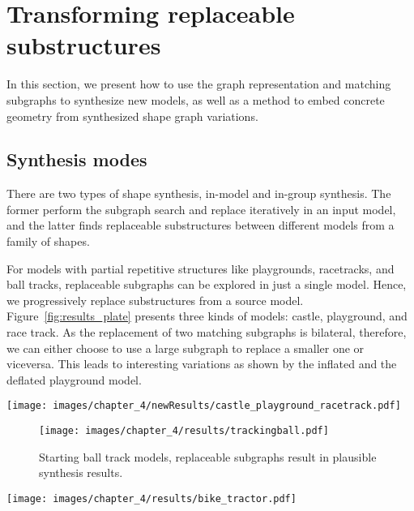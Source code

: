 \section{Transforming replaceable substructures}

In this section, we present how to use the graph representation and matching subgraphs to synthesize new models, as well as a method to embed concrete geometry from synthesized shape graph variations.

\subsection{Synthesis modes}

There are two types of shape synthesis, in-model and in-group synthesis. The former perform the subgraph search and replace iteratively in an input model, and the latter finds replaceable substructures between different models from a family of shapes.

For models with partial repetitive structures like playgrounds, racetracks, and ball tracks, replaceable subgraphs can be explored in just a single model. Hence, we progressively replace substructures from a source model. Figure~\ref{fig:results_plate} presents three kinds of models: castle, playground, and race track. As the replacement of two matching subgraphs is bilateral, therefore, we can either choose to use a large subgraph to replace a smaller one or viceversa. This leads to interesting variations as shown by the inflated and the deflated playground model.

\begin{figure*}[t!]
	\centering
		\texttt{[image: images/chapter\_4/newResults/castle\_playground\_racetrack.pdf]}
		\caption{Starting from single castle, playground, racetrack models, matching subgraphs are progressively found and replaced.}
\label{fig:results_plate}
\end{figure*}

\begin{figure}
	\centering
		\texttt{[image: images/chapter\_4/results/trackingball.pdf]}
		\caption{Starting  ball track models, replaceable subgraphs result in plausible synthesis results.}
	\label{fig:results_trackingball}
\end{figure}


\begin{figure*}[t!]
	\centering
		\texttt{[image: images/chapter\_4/results/bike\_tractor.pdf]}
		\caption[More synthesis examples of bikes and toy tractors.]{Synthesized bikes created from only 3 bike models, with 13, 15, and 16 parts, respectively. We show two graphs and associated highlight matching cuts/subgraphs on the right of each synthesized bike, the subgraph in the upper graph get replaced by the matching subgraph in the lower one. The synthesized results of toy tractors were created from 4 input models. }
	\label{fig:results_bikes}
\end{figure*}

